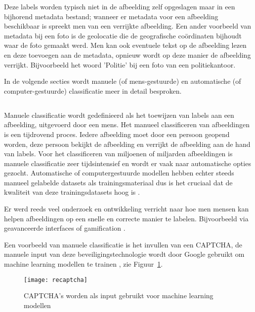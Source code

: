 Deze labels worden typisch niet in de afbeelding zelf opgeslagen maar in een bijhorend metadata bestand; wanneer er metadata voor een afbeelding beschikbaar is spreekt men van een verrijkte afbeelding. Een ander voorbeeld van metadata bij een foto is de geolocatie die de geografische coördinaten bijhoudt waar de foto gemaakt werd. Men kan ook eventuele tekst op de afbeelding lezen en deze toevoegen aan de metadata, opnieuw wordt op deze manier de afbeelding verrijkt. Bijvoorbeeld het woord 'Politie' bij een foto van een politiekantoor.

In de volgende secties wordt manuele (of mens-gestuurde) en automatische (of computer-gestuurde) classificatie meer in detail besproken.

\subsection{}
\label{sec:manuele-classificatie}
Manuele classificatie wordt gedefinieerd als het toewijzen van labels aan een afbeelding, uitgevoerd door een mens. Het manueel classificeren van afbeeldingen is een tijdrovend proces. Iedere afbeelding moet door een persoon geopend worden, deze persoon bekijkt de afbeelding en verrijkt de afbeelding aan de hand van labels. Voor het classificeren van miljoenen of miljarden afbeeldingen is manuele classificatie zeer tijdsintensief en wordt er vaak naar automatische opties gezocht. Automatische of computergestuurde modellen hebben echter steeds manueel gelabelde datasets als trainingsmateriaal dus is het cruciaal dat de kwaliteit van deze trainingsdatasets hoog is \autocite{JuliaMoehrmann2012}.

Er werd reeds veel onderzoek en ontwikkeling verricht naar hoe men mensen kan helpen afbeeldingen op een snelle en correcte manier te labelen. Bijvoorbeeld via geavanceerde interfaces \autocite{JuliaMoehrmann2012} of gamification \autocite{LuisvonAhn2004}. 

Een voorbeeld van manuele classificatie is het invullen van een CAPTCHA, de manuele input van deze beveiligingstechnologie wordt door Google gebruikt om machine learning modellen te trainen \autocite{Google2021}, zie Figuur~\ref{fig:captcha}.

\begin{figure}
    \centering    
    \texttt{[image: recaptcha]}
    \caption{CAPTCHA's worden als input gebruikt voor machine learning modellen \autocite{Poza2020}}
    \label{fig:captcha}
\end{figure}

